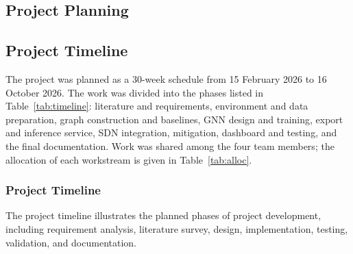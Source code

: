 
\begin{appendices}

\chapter{Project Planning}

\section{Project Timeline}
The project was planned as a 30-week schedule from 15 February 2026 to 16 October 2026. The work was divided into the phases listed in Table~\ref{tab:timeline}: literature and requirements, environment and data preparation, graph construction and baselines, GNN design and training, export and inference service, SDN integration, mitigation, dashboard and testing, and the final documentation. Work was shared among the four team members; the allocation of each workstream is given in Table~\ref{tab:alloc}.

\subsection{Project Timeline}

The project timeline illustrates the planned phases of project development, including requirement analysis, literature survey, design, implementation, testing, validation, and documentation.


\end{appendices}
